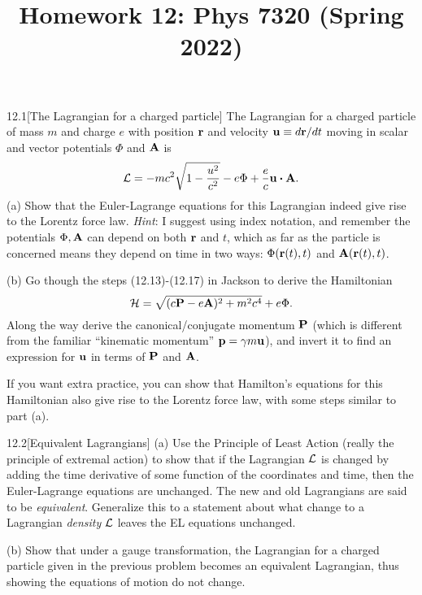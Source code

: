 \documentclass[12pt]{article}
\title{Homework 12: Phys 7320 (Spring 2022)}
\begin{document}
\maketitle
\begin{problem}{12.1}[The Lagrangian for a charged particle]
The Lagrangian for a charged particle of mass $m$ and charge $e$ with position
$\vb{r}$ and velocity $\vb{u}\equiv d\vb{r}/dt$ moving in scalar and vector
potentials $\Phi$ and $\vb{A}$ is
\begin{equation}
    \LL=-mc^2\sqrt{1-\frac{u^2}{c^2}}-e\Phi+\frac{e}{c}\vb{u}\vdot\vb{A}.
\end{equation}
(a) Show that the Euler-Lagrange equations for this Lagrangian indeed give rise
to the Lorentz force law. \textit{Hint}: I suggest using index notation, and
remember the potentials $\Phi,\vb{A}$ can depend on both $\vb{r}$ and $t$, which
as far as the particle is concerned means they depend on time in two ways:
$\Phi(\vb{r}(t),t)$ and $\vb{A}(\vb{r}(t),t)$.

(b) Go though the steps (12.13)-(12.17) in Jackson to derive the Hamiltonian
\begin{equation}
    \mathcal{H}=\sqrt{(c\vb{P}-e\vb{A})^2+m^2c^4}+e\Phi. 
\end{equation}
Along the way derive the canonical/conjugate momentum $\vb{P}$ (which is
different from the familiar ``kinematic momentum'' $\vb{p}=\gamma m\vb{u}$), and
invert it to find an expression for $\vb{u}$ in terms of $\vb{P}$ and $\vb{A}$.

If you want extra practice, you can show that Hamilton's equations for this
Hamiltonian also give rise to the Lorentz force law, with some steps similar to
part (a).
\begin{solution}
\end{solution}
\end{problem}
\newpage
\begin{problem}{12.2}[Equivalent Lagrangians]
(a) Use the Principle of Least Action (really the principle of extremal action)
to show that if the Lagrangian $\mathcal{L}$ is changed by adding the time derivative of
some function of the coordinates and time, then the Euler-Lagrange equations are
unchanged. The new and old Lagrangians are said to be \textit{equivalent}.
Generalize this to a statement about what change to a Lagrangian
\textit{density} $\mathcal{L}$ leaves the EL equations unchanged.

(b) Show that under a gauge transformation, the Lagrangian for a charged
particle given in the previous problem becomes an equivalent Lagrangian, thus
showing the equations of motion do not change.
\begin{solution}
\end{solution}
\end{problem}
\end{document}

